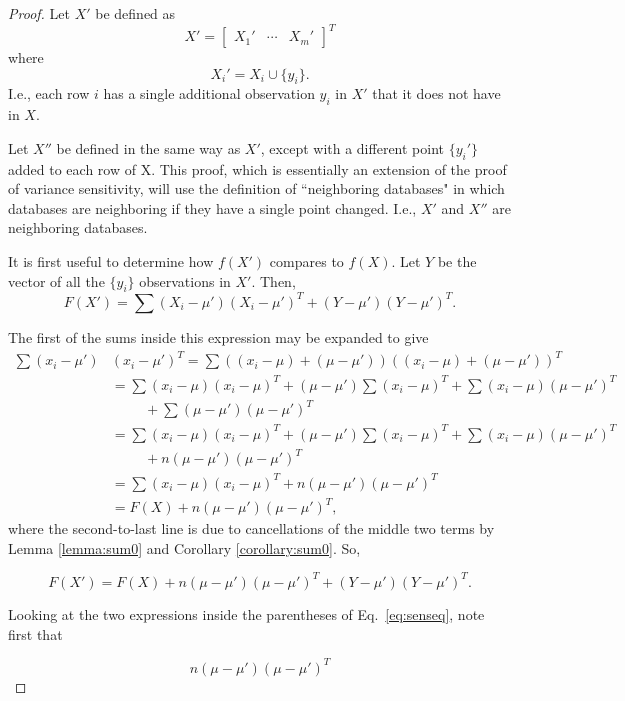 \documentclass[11pt, oneside]{article}   	%
\begin{document}
\begin{proof}
Let $X'$ be defined as 
$$ X' = 
\begin{bmatrix}
X_1' & \cdots & X_m' 
\end{bmatrix}^T
$$
where
$$ X_i' = X_i \cup \{y_i\}.$$
I.e., each row $i$ has a single additional observation $y_i$ in $X'$ that it does not have in $X$.

Let $X''$ be defined in the same way as $X'$, except with a different point $\{y_i'\}$ added to each row of X. This proof, which is essentially an extension of the proof of variance sensitivity, will use the definition of ``neighboring databases" in which databases are neighboring if they have a single point changed. I.e., $X'$ and $X''$ are neighboring databases. 

It is first useful to determine how $f(X')$ compares to $f(X)$. Let $Y$ be the vector of all the $\{y_i\}$ observations in $X'$. Then,
$$ F(X') =\sum (X_i - \mu')(X_i - \mu')^T + (Y-\mu')(Y-\mu')^T.$$

The first of the sums inside this expression may be expanded to give
\begin{align*}
\sum (x_i - \mu')&(x_i - \mu')^T = \sum ((x_i-\mu)+(\mu-\mu'))((x_i-\mu)+(\mu-\mu'))^T\\
	&= \sum (x_i - \mu)(x_i-\mu)^T + (\mu - \mu')\sum (x_i-\mu)^T + \sum (x_i-\mu)(\mu-\mu')^T \\
	&  \hspace{1cm} + \sum (\mu-\mu')(\mu-\mu')^T\\
	&= \sum (x_i - \mu)(x_i-\mu)^T + (\mu - \mu')\sum (x_i-\mu)^T + \sum (x_i-\mu)(\mu-\mu')^T \\
	&  \hspace{1cm} +n (\mu-\mu')(\mu-\mu')^T\\
	&= \sum (x_i - \mu)(x_i-\mu)^T + n (\mu-\mu')(\mu-\mu')^T \\
	&= F(X) + n (\mu-\mu')(\mu-\mu')^T,
\end{align*}
where the second-to-last line is due to cancellations of the middle two terms by Lemma \ref{lemma:sum0} and Corollary \ref{corollary:sum0}. So,

\begin{equation}
\label{eq:senseq}
F(X') =  F(X) + n(\mu-\mu')(\mu-\mu')^T + (Y-\mu')(Y-\mu')^T.
\end{equation}

Looking at the two expressions inside the parentheses of Eq.~\ref{eq:senseq}, note first that

$$ n(\mu-\mu')(\mu-\mu')^T $$


\end{proof}
\end{document}
